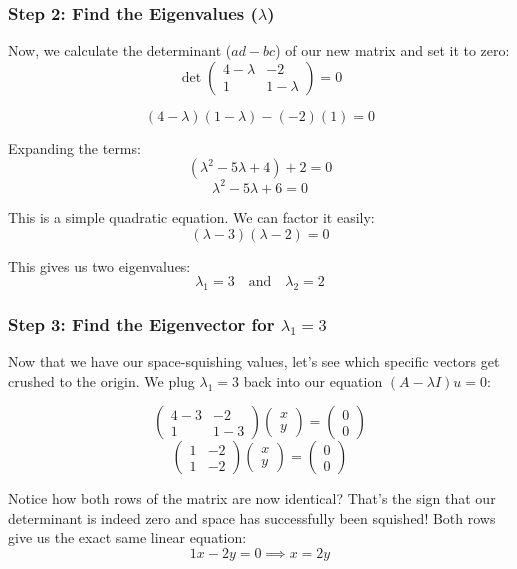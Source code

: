 \documentclass{article}
\begin{document}
\subsubsection*{Step 2: Find the Eigenvalues ($\lambda$)}

Now, we calculate the determinant ($ad - bc$) of our new matrix and set it to zero:
\[ \det \begin{pmatrix} 4-\lambda & -2 \\ 1 & 1-\lambda \end{pmatrix} = 0 \]

\[ (4 - \lambda)(1 - \lambda) - (-2)(1) = 0 \]

Expanding the terms:
\[ (\lambda^2 - 5\lambda + 4) + 2 = 0 \]
\[ \lambda^2 - 5\lambda + 6 = 0 \]

This is a simple quadratic equation. We can factor it easily:
\[ (\lambda - 3)(\lambda - 2) = 0 \]

This gives us two eigenvalues:
\[ \lambda_1 = 3 \quad \text{and} \quad \lambda_2 = 2 \]

\subsubsection*{Step 3: Find the Eigenvector for $\lambda_1 = 3$}

Now that we have our space-squishing values, let's see which specific vectors get crushed to the origin. We plug $\lambda_1 = 3$ back into our equation $(A - \lambda I)u = 0$:

\[ \begin{pmatrix} 4-3 & -2 \\ 1 & 1-3 \end{pmatrix} \begin{pmatrix} x \\ y \end{pmatrix} = \begin{pmatrix} 0 \\ 0 \end{pmatrix} \]
\[ \begin{pmatrix} 1 & -2 \\ 1 & -2 \end{pmatrix} \begin{pmatrix} x \\ y \end{pmatrix} = \begin{pmatrix} 0 \\ 0 \end{pmatrix} \]

Notice how both rows of the matrix are now identical? That's the sign that our determinant is indeed zero and space has successfully been squished! Both rows give us the exact same linear equation:
\[ 1x - 2y = 0 \implies x = 2y \]
\end{document}
